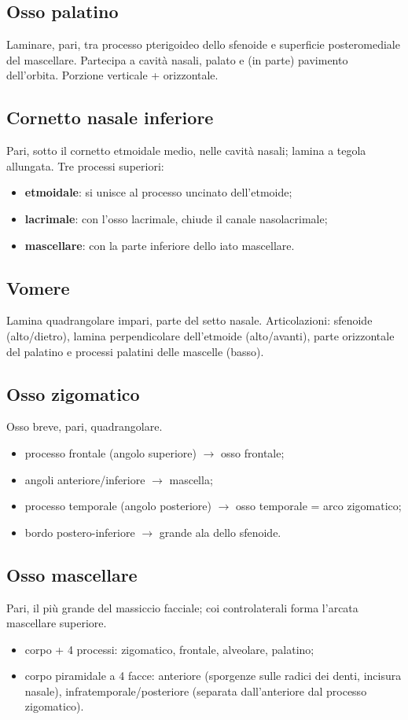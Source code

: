 \subsection{Osso palatino}
Laminare, pari, tra processo pterigoideo dello sfenoide e superficie posteromediale del mascellare.
Partecipa a cavità nasali, palato e (in parte) pavimento dell'orbita. Porzione verticale +
orizzontale.

\subsection{Cornetto nasale inferiore}
Pari, sotto il cornetto etmoidale medio, nelle cavità nasali; lamina a tegola allungata. Tre
processi superiori:
\begin{itemize}
  \item \textbf{etmoidale}: si unisce al processo uncinato dell'etmoide;
  \item \textbf{lacrimale}: con l'osso lacrimale, chiude il canale nasolacrimale;
  \item \textbf{mascellare}: con la parte inferiore dello iato mascellare.
\end{itemize}

\subsection{Vomere}
Lamina quadrangolare impari, parte del setto nasale. Articolazioni: sfenoide (alto/dietro), lamina
perpendicolare dell'etmoide (alto/avanti), parte orizzontale del palatino e processi palatini delle
mascelle (basso).

\subsection{Osso zigomatico}
Osso breve, pari, quadrangolare.
\begin{itemize}
  \item processo frontale (angolo superiore) $\rightarrow$ osso frontale;
  \item angoli anteriore/inferiore $\rightarrow$ mascella;
  \item processo temporale (angolo posteriore) $\rightarrow$ osso temporale = arco zigomatico;
  \item bordo postero-inferiore $\rightarrow$ grande ala dello sfenoide.
\end{itemize}

\subsection{Osso mascellare}
Pari, il più grande del massiccio facciale; coi controlaterali forma l'arcata mascellare superiore.
\begin{itemize}
  \item corpo + 4 processi: zigomatico, frontale, alveolare, palatino;
  \item corpo piramidale a 4 facce: anteriore (sporgenze sulle radici dei denti, incisura nasale),
    infratemporale/posteriore (separata dall'anteriore dal processo zigomatico).
\end{itemize}

